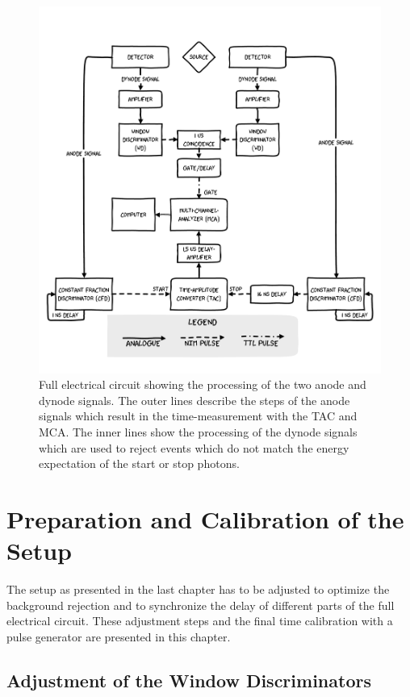 \documentclass[
	paper=A4,
	parskip=full,
	chapterprefix=true,
	11pt,
	headings=normal,
	bibliography=totoc,
	listof=totoc,
	titlepage=on,
]{scrreprt}
\begin{document}
\begin{figure}
	\centering
	\includegraphics{aufbau}
	\caption{Full electrical circuit showing the processing of the two anode and dynode signals. The outer lines describe the steps of the anode signals which result in the time-measurement with the TAC and MCA. The inner lines show the processing of the dynode signals which are used to reject events which do not match the energy expectation of the start or stop photons.}
	\label{fig:full_circuit}
\end{figure}


\chapter{Preparation and Calibration of the Setup}
The setup as presented in the last chapter has to be adjusted to optimize the background rejection and to synchronize the delay of different parts of the full electrical circuit. These adjustment steps and the final time calibration with a pulse generator are presented in this chapter.
\section{Adjustment of the Window Discriminators}
\end{document}
